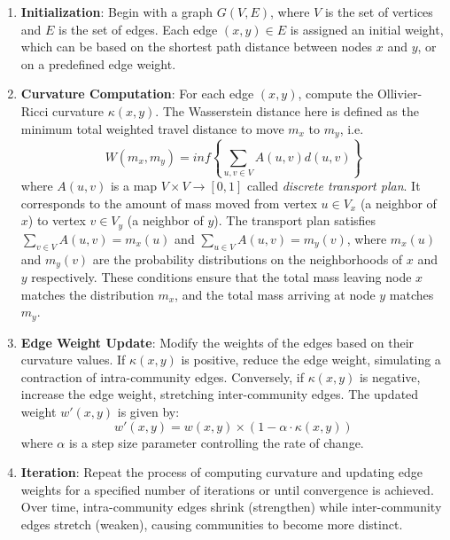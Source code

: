\begin{enumerate}
    \item \textbf{Initialization}: Begin with a graph $G(V, E)$, where $V$ is the set of vertices and $E$ is the set of edges. Each edge $(x, y) \in E$ is assigned an initial weight, which can be based on the shortest path distance between nodes $x$ and $y$, or on a predefined edge weight.
    
    \item \textbf{Curvature Computation}: For each edge $(x, y)$, compute the Ollivier-Ricci curvature $\kappa(x, y)$. The Wasserstein distance here is defined as the minimum total weighted travel distance to move $m_x$ to $m_y$, i.e.
    \begin{equation}
        W(m_x,m_y) =  \textit{inf} \left\{ \sum\limits_{u,v\in V} A(u,v) d(u,v)  \right\}
    \end{equation}
    where $A(u,v)$ is a map $V\times V \rightarrow [0,1]$ called \textit{discrete transport plan}. It corresponds to the amount of mass moved from vertex $u \in V_x$ (a neighbor of $x$) to vertex $v \in V_y$ (a neighbor of $y$). The transport plan satisfies $\sum_{v \in V} A(u,v) = m_x(u)$ and $\sum_{u \in V} A(u, v) = m_y(v)$, where $m_x (u)$ and $m_y(v)$ are the probability distributions on the neighborhoods of $x$ and $y$ respectively. These conditions ensure that the total mass leaving node $x$ matches the distribution $m_x$, and the total mass arriving at node $y$ matches $m_y$.
    \item \textbf{Edge Weight Update}: Modify the weights of the edges based on their curvature values. If $\kappa(x, y)$ is positive, reduce the edge weight, simulating a contraction of intra-community edges. Conversely, if $\kappa(x, y)$ is negative, increase the edge weight, stretching inter-community edges. The updated weight $w'(x, y)$ is given by:
    \begin{equation}\label{eq4}
    w'(x, y) = w(x, y) \times (1 - \alpha \cdot \kappa(x, y))
    \end{equation}
    where $\alpha$ is a step size parameter controlling the rate of change.
    
    \item \textbf{Iteration}: Repeat the process of computing curvature and updating edge weights for a specified number of iterations or until convergence is achieved. Over time, intra-community edges shrink (strengthen) while inter-community edges stretch (weaken), causing communities to become more distinct.


\end{enumerate}
